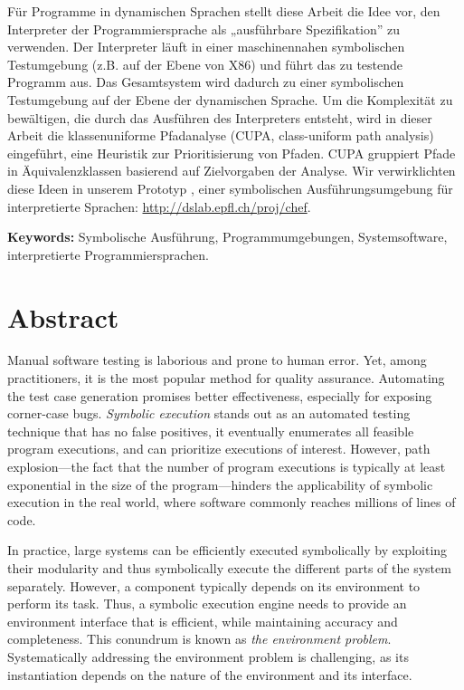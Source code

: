 Für Programme in dynamischen Sprachen stellt diese Arbeit die Idee vor, den Interpreter der Programmiersprache als „ausführbare Spezifikation” zu verwenden. Der Interpreter läuft in einer maschinennahen symbolischen Testumgebung (z.B. auf der Ebene von X86) und führt das zu testende Programm aus. Das Gesamtsystem wird dadurch zu einer symbolischen Testumgebung auf der Ebene der dynamischen Sprache. Um die Komplexität zu bewältigen, die durch das Ausführen des Interpreters entsteht, wird in dieser Arbeit die klassenuniforme Pfadanalyse (CUPA, class-uniform path analysis) eingeführt, eine Heuristik zur Prioritisierung von Pfaden. CUPA gruppiert Pfade in Äquivalenzklassen basierend auf Zielvorgaben der Analyse. Wir verwirklichten diese Ideen in unserem Prototyp \emph{\chef}, einer symbolischen Ausführungsumgebung für interpretierte Sprachen: {\url{http://dslab.epfl.ch/proj/chef}}.

\noindent \textbf{Keywords:} Symbolische Ausführung, Programmumgebungen, Systemsoftware, interpretierte Programmiersprachen.

\chapter*{Abstract}

Manual software testing is laborious and prone to human error.  Yet, among practitioners, it is the most popular method for quality assurance.  Automating the test case generation promises better effectiveness, especially for exposing corner-case bugs.
%
\emph{Symbolic execution} stands out as an automated testing technique that has no false positives, it eventually enumerates all feasible program executions, and can prioritize executions of interest.
%
However, path explosion---the fact that the number of program executions is typically at least exponential in the size of the program---hinders the applicability of symbolic execution in the real world, where software commonly reaches millions of lines of code.

In practice, large systems can be efficiently executed symbolically by exploiting their modularity and thus symbolically execute the different parts of the system separately.
%
However, a component typically depends on its environment to perform its task.  Thus, a symbolic execution engine needs to provide an environment interface that is efficient, while maintaining accuracy and completeness.  This conundrum is known as \emph{the environment problem}.
%
Systematically addressing the environment problem is challenging, as its instantiation depends on the nature of the environment and its interface.

